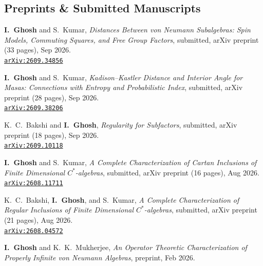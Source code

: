 \documentclass[10pt,a4paper,sans]{moderncv}
\begin{document}
\subsection{Preprints \& Submitted Manuscripts}
\begin{enumerate}[label={[\textbf{\color{accentblue}\arabic*}]}, leftmargin=2em, itemsep=0.45em, resume]
    \item \textbf{I.~Ghosh} and S.~Kumar, \emph{Distances Between von Neumann Subalgebras: Spin Models, Commuting Squares, and Free Group Factors}, submitted, arXiv preprint (33 pages), Sep 2026. \\[0.15em]
    \mbox{\href{https://arxiv.org/abs/2609.34856}{\small\textcolor{accentblue}{\enskip\texttt{arXiv:2609.34856}}}}

    \item \textbf{I.~Ghosh} and S.~Kumar, \emph{Kadison--Kastler Distance and Interior Angle for Masas: Connections with Entropy and Probabilistic Index}, submitted, arXiv preprint (28 pages), Sep 2026. \\[0.15em]
    \mbox{\href{https://arxiv.org/abs/2609.38206}{\small\textcolor{accentblue}{\enskip\texttt{arXiv:2609.38206}}}}

    \item K.~C.~Bakshi and \textbf{I.~Ghosh}, \emph{Regularity for Subfactors}, submitted, arXiv preprint (18 pages), Sep 2026. \\[0.15em]
    \mbox{\href{https://arxiv.org/abs/2609.10118}{\small\textcolor{accentblue}{\enskip\texttt{arXiv:2609.10118}}}}

    \item \textbf{I.~Ghosh} and S.~Kumar, \emph{A Complete Characterization of Cartan Inclusions of Finite Dimensional $C^*$-algebras}, submitted, arXiv preprint (16 pages), Aug 2026. \\[0.15em]
    \mbox{\href{https://arxiv.org/abs/2608.11711}{\small\textcolor{accentblue}{\enskip\texttt{arXiv:2608.11711}}}}

    \item K.~C.~Bakshi, \textbf{I.~Ghosh}, and S.~Kumar, \emph{A Complete Characterization of Regular Inclusions of Finite Dimensional $C^*$-algebras}, submitted, arXiv preprint (21 pages), Aug 2026. \\[0.15em]
    \mbox{\href{https://arxiv.org/abs/2608.04572}{\small\textcolor{accentblue}{\enskip\texttt{arXiv:2608.04572}}}}

    \item \textbf{I.~Ghosh} and K.~K.~Mukherjee, \emph{An Operator Theoretic Characterization of Properly Infinite von Neumann Algebras}, preprint, Feb 2026.
\end{enumerate}
\end{document}
